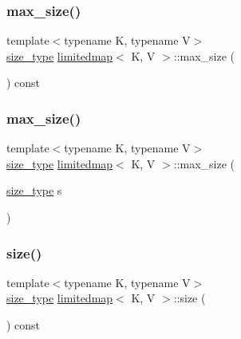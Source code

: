 \mbox{\label{classlimitedmap_a3b977a4a010f6c4513ee064835ecbf36}} 
\subsubsection{\texorpdfstring{max\+\_\+size()}{max\_size()}\hspace{0.1cm}{\footnotesize\ttfamily [1/2]}}
{\footnotesize\ttfamily template$<$typename K, typename V$>$ \\
\mbox{\hyperlink{classlimitedmap_a1c564b323f94e182e56aa27975e5f9d1}{size\+\_\+type}} \mbox{\hyperlink{classlimitedmap}{limitedmap}}$<$ K, V $>$\+::max\+\_\+size (\begin{DoxyParamCaption}{ }\end{DoxyParamCaption}) const\hspace{0.3cm}{\ttfamily [inline]}}

\mbox{\label{classlimitedmap_a97e3deba25cf9a59658cfc317507d45d}} 
\subsubsection{\texorpdfstring{max\+\_\+size()}{max\_size()}\hspace{0.1cm}{\footnotesize\ttfamily [2/2]}}
{\footnotesize\ttfamily template$<$typename K, typename V$>$ \\
\mbox{\hyperlink{classlimitedmap_a1c564b323f94e182e56aa27975e5f9d1}{size\+\_\+type}} \mbox{\hyperlink{classlimitedmap}{limitedmap}}$<$ K, V $>$\+::max\+\_\+size (\begin{DoxyParamCaption}\item[{\mbox{\hyperlink{classlimitedmap_a1c564b323f94e182e56aa27975e5f9d1}{size\+\_\+type}}}]{s }\end{DoxyParamCaption})\hspace{0.3cm}{\ttfamily [inline]}}

\mbox{\label{classlimitedmap_a11cfe0c541b69e34ec6b98239d3c9971}} 
\subsubsection{\texorpdfstring{size()}{size()}}
{\footnotesize\ttfamily template$<$typename K, typename V$>$ \\
\mbox{\hyperlink{classlimitedmap_a1c564b323f94e182e56aa27975e5f9d1}{size\+\_\+type}} \mbox{\hyperlink{classlimitedmap}{limitedmap}}$<$ K, V $>$\+::size (\begin{DoxyParamCaption}{ }\end{DoxyParamCaption}) const\hspace{0.3cm}{\ttfamily [inline]}}

